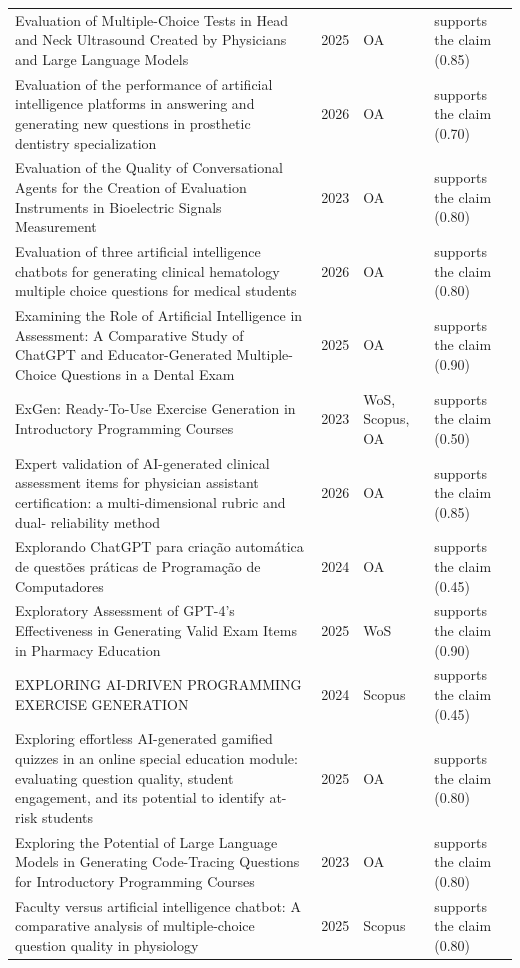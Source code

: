 \begin{longtable}{@{}%
  >{\raggedright\arraybackslash}p{}c%
  >{\raggedright\arraybackslash}p{}%
  >{\raggedright\arraybackslash}p{}@{}}
Evaluation of Multiple-Choice Tests in Head and Neck Ultrasound Created by Physicians and Large Language Models & 2025 & OA & supports the claim (0.85) \\
Evaluation of the performance of artificial intelligence platforms in answering and generating new questions in prosthetic dentistry specialization & 2026 & OA & supports the claim (0.70) \\
Evaluation of the Quality of Conversational Agents for the Creation of Evaluation Instruments in Bioelectric Signals Measurement & 2023 & OA & supports the claim (0.80) \\
Evaluation of three artificial intelligence chatbots for generating clinical hematology multiple choice questions for medical students & 2026 & OA & supports the claim (0.80) \\
Examining the Role of Artificial Intelligence in Assessment: A Comparative Study of ChatGPT and Educator-Generated Multiple-Choice Questions in a Dental Exam & 2025 & OA & supports the claim (0.90) \\
ExGen: Ready-To-Use Exercise Generation in Introductory Programming Courses & 2023 & WoS, Scopus, OA & supports the claim (0.50) \\
Expert validation of AI-generated clinical assessment items for physician assistant certification: a multi-dimensional rubric and dual- reliability method & 2026 & OA & supports the claim (0.85) \\
Explorando ChatGPT para criação automática de questões práticas de Programação de Computadores & 2024 & OA & supports the claim (0.45) \\
Exploratory Assessment of GPT-4's Effectiveness in Generating Valid Exam Items in Pharmacy Education & 2025 & WoS & supports the claim (0.90) \\
EXPLORING AI-DRIVEN PROGRAMMING EXERCISE GENERATION & 2024 & Scopus & supports the claim (0.45) \\
Exploring effortless AI-generated gamified quizzes in an online special education module: evaluating question quality, student engagement, and its potential to identify at-risk students & 2025 & OA & supports the claim (0.80) \\
Exploring the Potential of Large Language Models in Generating Code-Tracing Questions for Introductory Programming Courses & 2023 & OA & supports the claim (0.80) \\
Faculty versus artificial intelligence chatbot: A comparative analysis of multiple-choice question quality in physiology & 2025 & Scopus & supports the claim (0.80) \\

\end{longtable}

